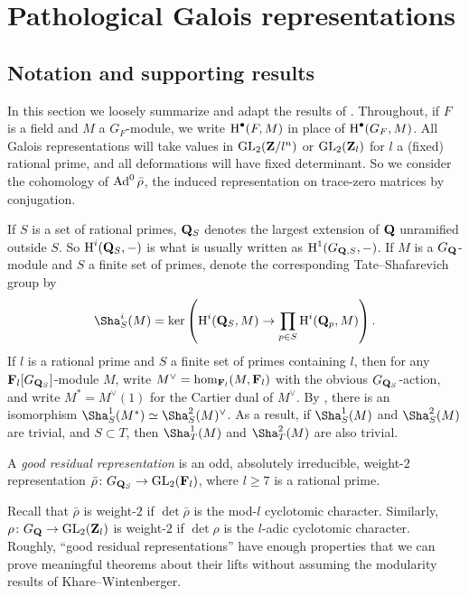 
\chapter{Pathological Galois representations}\label{ch:construct-Galois}





\section{Notation and supporting results}

In this section we loosely summarize and adapt the results of 
\cite{khare-larsen-ramakrishna-2005,pande-2011}. Throughout, if $F$ is a field 
and $M$ a $G_F$-module, we write $\operatorname{H}^\bullet(F,M)$ in place of 
$\operatorname{H}^\bullet(G_F,M)$. All Galois representations will take values in 
$\operatorname{GL}_2(\mathbf{Z}/l^n)$ or $\operatorname{GL}_2(\mathbf{Z}_l)$ for $l$ a (fixed) rational prime, and 
all deformations will have fixed determinant. So we consider the cohomology of 
$\operatorname{Ad}^0\bar\rho$, the induced representation on trace-zero matrices by 
conjugation. 

If $S$ is a set of rational primes, $\mathbf{Q}_S$ denotes the largest extension of 
$\mathbf{Q}$ unramified outside $S$. So $\operatorname{H}^i(\mathbf{Q}_S,-)$ is what is usually written as 
$\operatorname{H}^1(G_{\mathbf{Q},S},-)$. If $M$ is a $G_{\mathbf{Q}}$-module and $S$ a finite set of primes, 
denote the corresponding Tate--Shafarevich group by 
\[
	\Sha^i_S(M) = \ker\left( \h^i(\bQ_S,M) \to \prod_{p\in S} \h^i(\bQ_p,M)\right) .
\]
If $l$ is a rational prime and $S$ a finite set of primes containing $l$, then 
for any $\mathbf{F}_l[G_{\mathbf{Q}_S}]$-module $M$, write $M^\vee=\hom_{\mathbf{F}_l}(M,\mathbf{F}_l)$ 
with the obvious $G_{\mathbf{Q}_S}$-action, and write $M^\ast = M^\vee(1)$ for the 
Cartier dual of $M^\vee$. By \cite[Th.~8.6.7]{neukirch-schmidt-winberg-2008}, 
there is an isomorphism $\Sha^1_S(M^\ast) \simeq \Sha_S^2(M)^\vee$. As a 
result, if $\Sha_S^1(M)$ and $\Sha_S^2(M)$ are trivial, and $S\subset T$, then 
$\Sha_T^1(M)$ and $\Sha_T^2(M)$ are also trivial. 

\begin{definition}
A \emph{good residual representation} is an odd, absolutely irreducible, 
weight-$2$ representation $\bar\rho\colon G_{\mathbf{Q}_S} \to \operatorname{GL}_2(\mathbf{F}_l)$, where 
$l\geqslant 7$ is a rational prime. 
\end{definition}

Recall that $\bar\rho$ is weight-$2$ if $\det\bar\rho$ is the mod-$l$ 
cyclotomic character. Similarly, $\rho\colon G_{\mathbf{Q}} \to \operatorname{GL}_2(\mathbf{Z}_l)$ is 
weight-$2$ if $\det\rho$ is the $l$-adic cyclotomic character. 
Roughly, ``good residual representations'' have enough properties that we can 
prove meaningful theorems about their lifts without assuming the modularity 
results of Khare--Wintenberger. 

